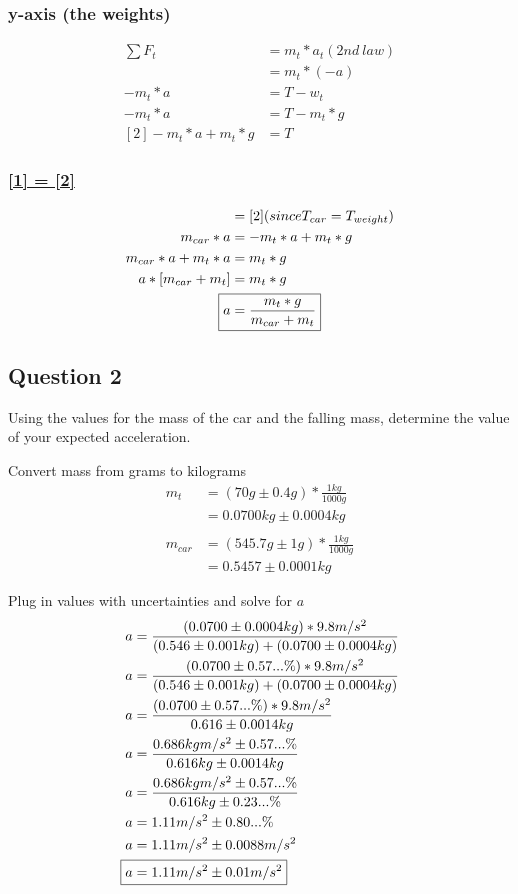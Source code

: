 \documentclass{article}
\begin{document}
\subsubsection{y-axis (the weights)}
\begin{align*}
\sum{F_{t}} 		& = m_{t} * a_{t}	(2nd\ law) \\
				& = m_{t} * (-a) \\
-m_{t}*a 		& = T - w_{t} \\
-m_{t}*a 		& = T - m_{t}*g \\
[2] -m_{t}*a + m_{t}* g		& = T
\end{align*}


\subsubsection{\underline{[1] = [2]}}
\begin{align*}
[1] & = [2] (since T_{car} = T_{weight}) \\
m_{car}*a 		& = -m_{t}*a + m_{t}*g \\
m_{car}*a + m_{t}*a 	& = m_{t}*g \\
a*[m_{car} + m_{t}] 	& = m_{t}*g \\
\Aboxed{a & = \frac{m_{t}*g}{m_{car} + m_{t}}}
\end{align*}

\pagebreak

\subsection{Question 2}
Using the values for the mass of the car and the falling mass, determine the value of your expected acceleration.

Convert mass from grams to kilograms
\begin{align*}
m_{t} 		& = (70g\pm0.4g) * \frac{1kg}{1000g}\\
			& = 0.0700kg\pm0.0004kg\\
\\
m_{car}		& = (545.7g\pm1g) * \frac{1kg}{1000g}\\
			& = 0.5457\pm0.0001kg
\end{align*}

Plug in values with uncertainties and solve for $a$
\begin{align*}
a 			& = \frac{(0.0700\pm0.0004kg) * 9.8m/s^2}{(0.546\pm0.001kg) + (0.0700\pm0.0004kg)}\\
a 			& = \frac{(0.0700\pm0.57...\%) * 9.8m/s^2}{(0.546\pm0.001kg) + (0.0700\pm0.0004kg)}\\
a 			& = \frac{(0.0700\pm0.57...\%) * 9.8m/s^2}{0.616\pm0.0014kg}\\
a 			& = \frac{0.686kgm/s^2\pm0.57...\%}{0.616kg\pm0.0014kg}\\
a 			& = \frac{0.686kgm/s^2\pm0.57...\%}{0.616kg\pm0.23...\%}\\
a 			& = 1.11m/s^2 \pm 0.80...\%\\
a 			& = 1.11m/s^2 \pm 0.0088m/s^2\\
\Aboxed{a 	& = 1.11m/s^2 \pm 0.01m/s^2}
\end{align*}
\end{document}
